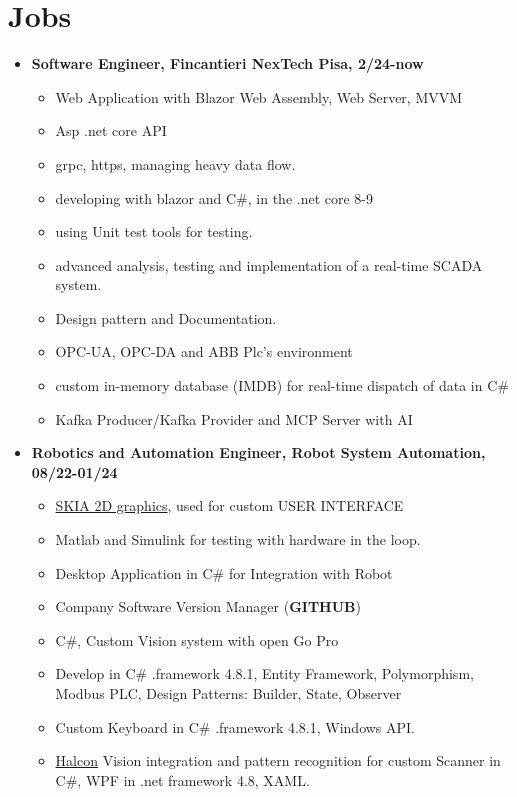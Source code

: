 \documentclass{article}
\begin{document}
\section{Jobs}
\begin{itemize}
\item \textbf{Software Engineer, Fincantieri NexTech Pisa, 2/24-now}
\begin{itemize}
    \item Web Application with Blazor Web Assembly, Web Server, MVVM
    \item Asp .net core API
    \item grpc, https, managing heavy data flow.
    \item developing with blazor and C\#, in the .net core 8-9
    \item using Unit test tools for testing.
    \item advanced analysis, testing and implementation of a real-time SCADA system.
    \item Design pattern and Documentation.
    \item OPC-UA, OPC-DA and ABB Plc's environment
    \item custom in-memory database (IMDB) for real-time dispatch of data in C\#
    \item Kafka Producer/Kafka Provider and MCP Server with AI
\end{itemize}
\item \textbf{Robotics and Automation Engineer, Robot System Automation, 08/22-01/24}
\begin{itemize}
    \item \href{https://skia.org/}{SKIA 2D graphics}, used for custom USER INTERFACE
    \item Matlab and Simulink for testing with hardware in the loop.
    \item Desktop Application in C\# for Integration with Robot
    \item Company Software Version Manager (\textbf{GITHUB})
    \item C\#, Custom Vision system with open Go Pro
    \item Develop in C\# .framework 4.8.1, Entity Framework, Polymorphism, Modbus PLC, Design Patterns: Builder, State, Observer
    \item Custom Keyboard in C\# .framework 4.8.1, Windows API.
    \item \href{https://www.mvtec.com/products/halcon}{Halcon} Vision integration and pattern recognition for custom Scanner in C\#, WPF in .net framework 4.8, XAML.

\end{itemize}
\end{itemize}
\end{document}
